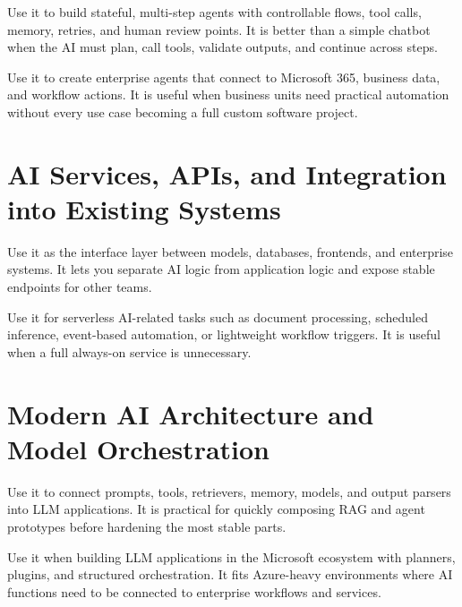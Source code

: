 \documentclass[a4paper]{article}
\begin{document}
\begin{tcolorbox}[title={LangGraph}]
Use it to build stateful, multi-step agents with controllable flows, tool calls, memory, retries, and human review points.
It is better than a simple chatbot when the AI must plan, call tools, validate outputs, and continue across steps.
\end{tcolorbox}

\begin{tcolorbox}[title={Microsoft Copilot Studio}]
Use it to create enterprise agents that connect to Microsoft 365, business data, and workflow actions.
It is useful when business units need practical automation without every use case becoming a full custom software project.
\end{tcolorbox}

\section{AI Services, APIs, and Integration into Existing Systems}

\begin{tcolorbox}[title={FastAPI}]
Use it as the interface layer between models, databases, frontends, and enterprise systems.
It lets you separate AI logic from application logic and expose stable endpoints for other teams.
\end{tcolorbox}

\begin{tcolorbox}[title={Azure Functions}]
Use it for serverless AI-related tasks such as document processing, scheduled inference, event-based automation, or lightweight workflow triggers.
It is useful when a full always-on service is unnecessary.
\end{tcolorbox}

\section{Modern AI Architecture and Model Orchestration}

\begin{tcolorbox}[title={LangChain}]
Use it to connect prompts, tools, retrievers, memory, models, and output parsers into LLM applications.
It is practical for quickly composing RAG and agent prototypes before hardening the most stable parts.
\end{tcolorbox}

\begin{tcolorbox}[title={Semantic Kernel}]
Use it when building LLM applications in the Microsoft ecosystem with planners, plugins, and structured orchestration.
It fits Azure-heavy environments where AI functions need to be connected to enterprise workflows and services.
\end{tcolorbox}
\end{document}
